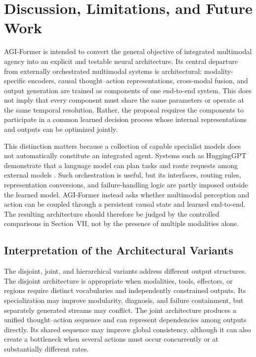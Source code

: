 \section{\textbf{Discussion, Limitations, and Future Work}}

AGI-Former is intended to convert the general objective of integrated multimodal agency into an explicit and testable neural architecture. Its central departure from externally orchestrated multimodal systems is architectural: modality-specific encoders, causal thought--action representations, cross-modal fusion, and output generation are trained as components of one end-to-end system. This does not imply that every component must share the same parameters or operate at the same temporal resolution. Rather, the proposal requires the components to participate in a common learned decision process whose internal representations and outputs can be optimized jointly.

This distinction matters because a collection of capable specialist models does not automatically constitute an integrated agent. Systems such as HuggingGPT demonstrate that a language model can plan tasks and route requests among external models \cite{shen2023hugginggpt}. Such orchestration is useful, but its interfaces, routing rules, representation conversions, and failure-handling logic are partly imposed outside the learned model. AGI-Former instead asks whether multimodal perception and action can be coupled through a persistent causal state and learned end-to-end. The resulting architecture should therefore be judged by the controlled comparisons in Section~VII, not by the presence of multiple modalities alone.

\subsection{\textbf{Interpretation of the Architectural Variants}}

The disjoint, joint, and hierarchical variants address different output structures. The disjoint architecture is appropriate when modalities, tools, effectors, or regions require distinct vocabularies and independently constrained outputs. Its specialization may improve modularity, diagnosis, and failure containment, but separately generated streams may conflict. The joint architecture produces a unified thought--action sequence and can represent dependencies among outputs directly. Its shared sequence may improve global consistency, although it can also create a bottleneck when several actions must occur concurrently or at substantially different rates.

